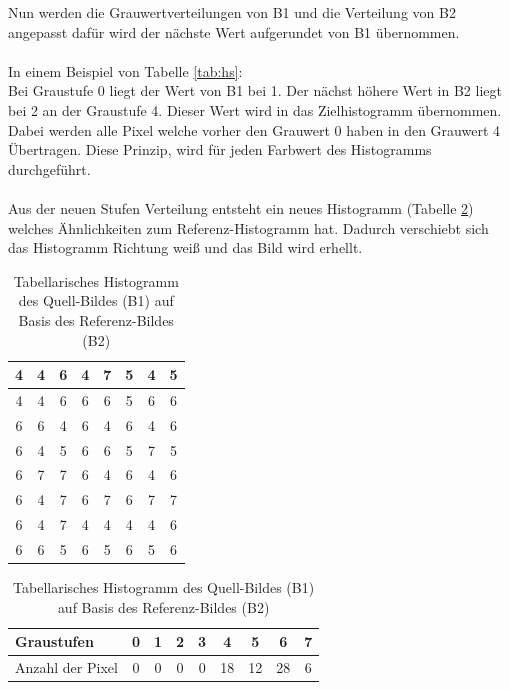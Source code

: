 Nun werden die Grauwertverteilungen von B1 und die Verteilung von B2 angepasst dafür wird der nächste Wert aufgerundet von B1 übernommen.\\\\
In einem Beispiel von Tabelle \ref{tab:hs}: \\
Bei Graustufe 0 liegt der Wert von B1 bei 1. Der nächst höhere Wert in B2 liegt bei 2 an der Graustufe 4. Dieser Wert wird in das Zielhistogramm übernommen. Dabei werden alle Pixel welche vorher den Grauwert 0 haben in den Grauwert 4 Übertragen. Diese Prinzip, wird für jeden Farbwert des Histogramms durchgeführt.\\\\
Aus der neuen Stufen Verteilung entsteht ein neues Histogramm (Tabelle \ref{tab:B3}) welches Ähnlichkeiten zum Referenz-Histogramm hat. Dadurch verschiebt sich das Histogramm Richtung weiß und das Bild wird erhellt.
  \begin{table}
  [h]
  \caption{Tabellarisches Histogramm des Quell-Bildes (B1) auf Basis des Referenz-Bildes (B2)}
  \label{tab:B3}
  \centering
  \begin{minipage}{\textwidth}
  \center
  \begin{tabular}{|c|c|c|c|c|c|c|c|}
  \hline
  4&4&6&4&7&5&4&5\\
  \hline
  4&4&6&6&6&5&6&6\\
  \hline
  6&6&4&6&4&6&4&6\\
  \hline
  6&4&5&6&6&5&7&5\\
  \hline
  6&7&7&6&4&6&4&6\\
  \hline
  6&4&7&6&7&6&7&7\\
  \hline
  6&4&7&4&4&4&4&6\\
  \hline
  6&6&5&6&5&6&5&6\\
  \hline
  \end{tabular}
  \end{minipage}
  \begin{minipage}{\textwidth}
  \hspace{\textwidth}
  \end{minipage}
  \begin{minipage}{\textwidth}
  \center
  \begin{tabular}{|l|c|c|c|c|c|c|c|c|}
  \hline
  Graustufen & 0 & 1 & 2 & 3 & 4 & 5 & 6 & 7\\
  \hline
  Anzahl der Pixel & 0 & 0 & 0 & 0 & 18 & 12 & 28 & 6\\
  \hline
  \end{tabular}
  \end{minipage}
  \end{table}